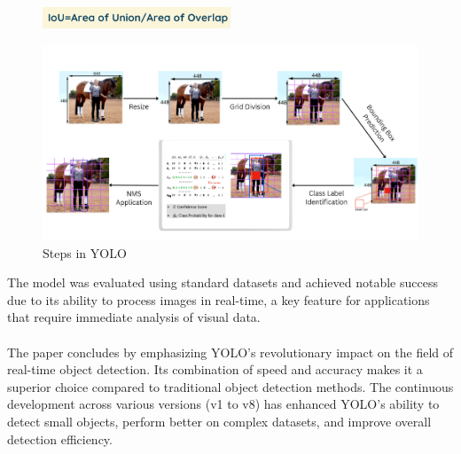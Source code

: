 %
%
  \begin{figure}[h!]
    \centering
    \includegraphics[width=0.5\textwidth]{images/IoU.png}
  \end{figure}
%  
% 
  \begin{figure}[h!]
    \centering
    \includegraphics[width=1\textwidth]{images/Yolo Steps.png}
    \caption{Steps in YOLO}
  \end{figure}
%
%
The model was evaluated using standard datasets and achieved notable success due to its ability to process images in real-time, a key feature for applications that require immediate analysis of visual data.\\\\
%
The paper concludes by emphasizing YOLO's revolutionary impact on the field of real-time object detection. Its combination of speed and accuracy makes it a superior choice compared to traditional object detection methods. The continuous development across various versions (v1 to v8) has enhanced YOLO's ability to detect small objects, perform better on complex datasets, and improve overall detection efficiency.\\
%  
% 
